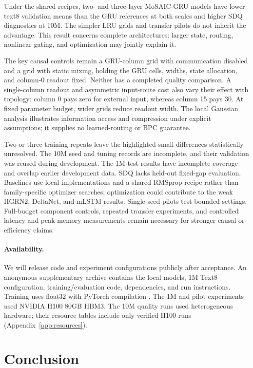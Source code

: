 \documentclass[letterpaper,twoside]{article}
\begin{document}
Under the shared recipes, two- and three-layer MoSAIC-GRU models have lower text8 validation means than the GRU references at both scales and higher SDQ diagnostics at 10M. The simpler LRU grids and transfer pilots do not inherit the advantage. This result concerns complete architectures: larger state, routing, nonlinear gating, and optimization may jointly explain it.

The key causal controls remain a GRU-column grid with communication disabled and a grid with static mixing, holding the GRU cells, widths, state allocation, and column-0 readout fixed. Neither has a completed quality comparison. A single-column readout and asymmetric input-route cost also vary their effect with topology: column 0 pays zero for external input, whereas column 15 pays 30. At fixed parameter budget, wider grids reduce readout width. The local Gaussian analysis illustrates information access and compression under explicit assumptions; it supplies no learned-routing or BPC guarantee.

Two or three training repeats leave the highlighted small differences statistically unresolved. The 10M seed and tuning records are incomplete, and their validation was reused during development. The 1M test results have incomplete coverage and overlap earlier development data. SDQ lacks held-out fixed-gap evaluation. Baselines use local implementations and a shared RMSprop recipe rather than family-specific optimizer searches; optimization could contribute to the weak HGRN2, DeltaNet, and mLSTM results. Single-seed pilots test bounded settings. Full-budget component controls, repeated transfer experiments, and controlled latency and peak-memory measurements remain necessary for stronger causal or efficiency claims.

\paragraph{Availability.}
We will release code and experiment configurations publicly after acceptance. An anonymous supplementary archive contains the local models, 1M Text8 configuration, training/evaluation code, dependencies, and run instructions. Training uses float32 with PyTorch compilation \citep{paszke2019pytorch}. The 1M and pilot experiments used NVIDIA H100 80GB HBM3. The 10M quality runs used heterogeneous hardware; their resource tables include only verified H100 runs (Appendix~\ref{app:resources}).

\section{Conclusion}
\end{document}
